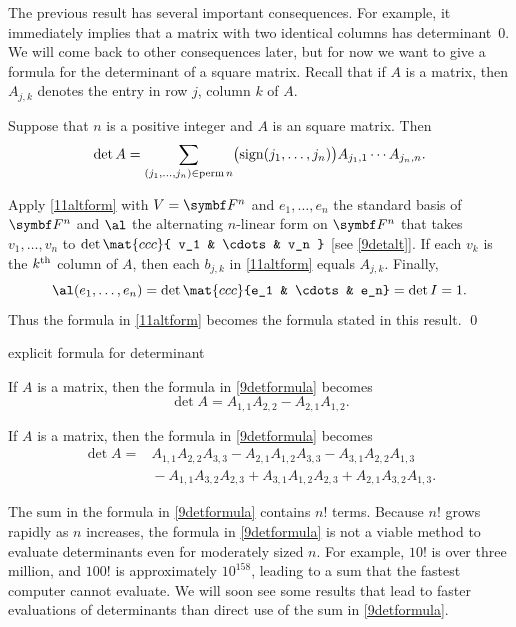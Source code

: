 The previous result has several important consequences. For example, it immediately implies that a matrix with two identical columns has determinant~$0$. We will come back to other consequences later, but for now we want to give a formula for the determinant of a square matrix. Recall that if $A$ is a matrix, then $A_{j,k}$ denotes the entry in row $j$, column $k$ of $A$.

{Suppose that $n$ is a positive integer and $A$ is an  square matrix. Then
\[
\det A = \sum_{(j_1, \ldots, j_n) \in \perm n} \paren[\big]{ \sign(j_1, \ldots, j_n) } A_{j_1,1} \cdots A_{j_n,n}.
\]}

\proof
Apply \ref{11altform} with $V = \F n$ and $e_1, \ldots, e_n$ the standard basis of $\F n$ and $\al$ the alternating $n$-linear form on
$\F n$ that takes $v_1, \ldots, v_n$ to $\det \mat{ccc}{ v_1 & \cdots & v_n }$ [see \ref{9detalt}]. If each $v_k$ is the $k^\nth$ column of $A$, then each $b_{j,k}$ in \ref{11altform} equals $A_{j,k}$. Finally,
\[
\al(e_1, \ldots, e_n) = \det \mat{ccc}{e_1 & \cdots & e_n} = \det I = 1.
\]
Thus the formula in \ref{11altform} becomes the formula stated in this result.
\qed

\begin{example}{explicit formula for determinant}
\begin{Itemize}
\item
If $A$ is a  matrix, then the formula in \ref{9detformula} becomes
\[
\det A = A_{1,1} A_{2,2} - A_{2,1} A_{1,2}.
\]

\item
If $A$ is a  matrix, then the formula in \ref{9detformula} becomes
\begin{align*}
\det A = &A_{1,1} A_{2,2} A_{3,3} - A_{2,1} A_{1,2} A_{3,3} - A_{3,1} A_{2,2} A_{1,3} \\[3bp]
& {}- A_{1,1} A_{3,2} A_{2,3} + A_{3,1} A_{1,2} A_{2,3}
+ A_{2,1} A_{3,2} A_{1,3}.
\end{align*}
\end{Itemize}
\vspace{-8bp}
\end{example}

The sum in the formula in \ref{9detformula} contains $n!$ terms. Because $n!$ grows rapidly as $n$ increases, the formula in \ref{9detformula} is not a viable method to evaluate determinants even for moderately sized $n$. For example, $10!$ is over three million, and $100!$ is approximately $10^{158}$, leading to a sum that the fastest computer cannot evaluate. We will soon see some results that lead to faster evaluations of determinants than direct use of the sum in \ref{9detformula}.

